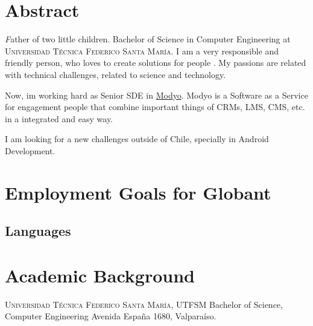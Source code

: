 \documentclass[11pt,letterpaper,roman]{moderncv}
\begin{document}
\maketitle

\section*{\textbf{Abstract}} 
	\textsl Father of two little children. Bachelor of Science in Computer Engineering at
	\textsc{Universidad Técnica Federico Santa María}. I am a very responsible and friendly person, who loves
	to create solutions for people . My passions are related with technical challenges, related to science and technology.

	Now, im working hard as Senior SDE in \href{http://www.modyo.com}{Modyo}. Modyo is a Software as a Service for engagement 
	people that combine important things of CRMs, LMS, CMS, etc. in a integrated and easy way.

	I am looking for a new challenges outside of Chile, specially in Android Development.

\section{Employment Goals for Globant}

\subsection{Languages} 

\section{Academic Background}
	{\textsc{Universidad T\'ecnica Federico Santa Mar\'ia, UTFSM}}
	{Bachelor of Science, Computer Engineering}{}
	{}
	{Avenida España 1680, Valparaíso.}
\end{document}
